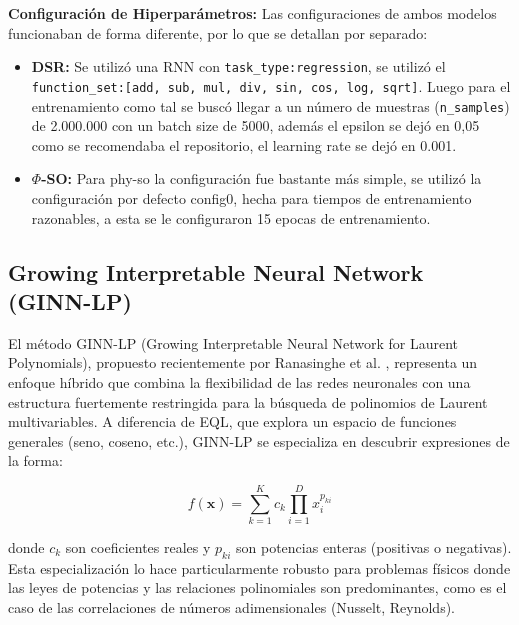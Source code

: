 \textbf{Configuración de Hiperparámetros:} Las configuraciones de ambos modelos funcionaban de forma diferente, por lo que se detallan por separado:

\begin{itemize}
    \item \textbf{DSR:} Se utilizó una RNN con \texttt{task\_type:regression}, se utilizó el \texttt{function\_set:[\textquotedbl add\textquotedbl, \textquotedbl sub\textquotedbl, \textquotedbl mul\textquotedbl, \textquotedbl div\textquotedbl, \textquotedbl sin\textquotedbl, \textquotedbl cos\textquotedbl, \textquotedbl log\textquotedbl, \textquotedbl sqrt\textquotedbl]}. Luego para el entrenamiento como tal se buscó llegar a un número de muestras (\texttt{n\_samples}) de 2.000.000 con un batch size de 5000, además el epsilon se dejó en 0,05 como se recomendaba el repositorio, el learning rate se dejó en 0.001.
    \item \textbf{$\Phi$-SO:} Para phy-so la configuración fue bastante más simple, se utilizó la configuración por defecto config0, hecha para tiempos de entrenamiento razonables, a esta se le configuraron 15 epocas de entrenamiento.
\end{itemize}



\subsection{Growing Interpretable Neural Network (GINN-LP)}

El método GINN-LP (Growing Interpretable Neural Network for Laurent Polynomials), propuesto recientemente por Ranasinghe et al. \cite{}, representa un enfoque híbrido que combina la flexibilidad de las redes neuronales con una estructura fuertemente restringida para la búsqueda de polinomios de Laurent multivariables. A diferencia de EQL, que explora un espacio de funciones generales (seno, coseno, etc.), GINN-LP se especializa en descubrir expresiones de la forma:

\begin{equation}
    f(\mathbf{x}) = \sum_{k=1}^{K} c_k \prod_{i=1}^{D} x_i^{p_{ki}}
\end{equation}

donde $c_k$ son coeficientes reales y $p_{ki}$ son potencias enteras (positivas o negativas). Esta especialización lo hace particularmente robusto para problemas físicos donde las leyes de potencias y las relaciones polinomiales son predominantes, como es el caso de las correlaciones de números adimensionales (Nusselt, Reynolds).

